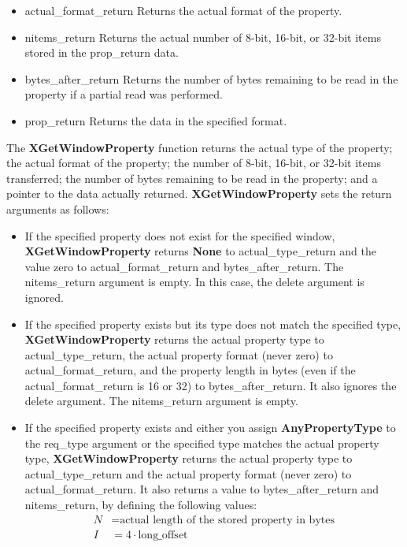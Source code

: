 \documentclass{report}
\begin{document}
\begin{itemize}
\begin{itemize}
            \item actual\_format\_return Returns the actual format of the property.
            \item nitems\_return Returns the actual number of 8-bit, 16-bit, or 32-bit items stored in the prop\_return data.
            \item bytes\_after\_return Returns the number of bytes remaining to be read in the property if a partial read was performed.
            \item prop\_return Returns the data in the specified format.
        \end{itemize}
        The \textbf{XGetWindowProperty} function returns the actual type of the property; the actual format of the property; the number of 8-bit, 16-bit, or 32-bit items transferred; the number of bytes remaining to be read in the property; and a pointer to the data actually returned. \textbf{XGetWindowProperty} sets the return arguments as follows:
        \begin{itemize}
            \item If the specified property does not exist for the specified window, \textbf{XGetWindowProperty} returns \textbf{None} to actual\_type\_return and the value zero to actual\_format\_return and bytes\_after\_return. The nitems\_return argument is empty. In this case, the delete argument is ignored.
            \item If the specified property exists but its type does not match the specified type, \textbf{XGetWindowProperty} returns the actual property type to actual\_type\_return, the actual property format (never zero) to actual\_format\_return, and the property length in bytes (even if the actual\_format\_return is 16 or 32) to bytes\_after\_return. It also ignores the delete argument. The nitems\_return argument is empty.
            \item If the specified property exists and either you assign \textbf{AnyPropertyType} to the req\_type argument or the specified type matches the actual property type, \textbf{XGetWindowProperty} returns the actual property type to actual\_type\_return and the actual property format (never zero) to actual\_format\_return. It also returns a value to bytes\_after\_return and nitems\_return, by defining the following values:
                \begin{align*}
                    N &= \text{actual length of the stored property in bytes} \\
                    I &= 4 \cdot \text{long\_offset} \\

\end{align*}
\end{itemize}
\end{itemize}
\end{document}
